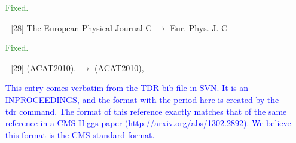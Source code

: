 \documentclass[paper=a4, fontsize=11pt]{scrartcl}
\begin{document}
\begin{itemize}
\textcolor{ForestGreen}{Fixed.}

\item [-]  [28] The European Physical Journal C  $\rightarrow$ Eur. Phys. J. C

\textcolor{ForestGreen}{Fixed.}

\item  [-] [29] (ACAT2010). $\rightarrow$ (ACAT2010),

\textcolor{blue}{This entry comes verbatim from the TDR bib file in SVN.
It is an INPROCEEDINGS, and the format with the period here is created by the tdr command.
The format of this reference exactly matches that of the same reference in a CMS Higgs paper 
(http://arxiv.org/abs/1302.2892). We believe this format is the CMS standard format.}


\end{itemize}
\end{document}

